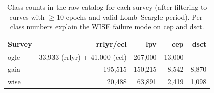 \begin{table}
\centering
\caption{Class counts in the raw catalog for each survey (after filtering to curves with $\ge 10$ epochs and valid Lomb--Scargle period).  Per-class numbers explain the WISE failure mode on cep and dsct.}
\label{tab:class_balance}
\begin{tabular}{lrrrr}
\toprule
Survey & rrlyr/ecl & lpv & cep & dsct \\
\midrule
ogle & 33,933 (rrlyr) + 41,000 (ecl) & 267,000 & 13,000 & -- \\
gaia & 195,515 & 150,215 & 8,542 & 8,870 \\
wise & 20,488 & 63,891 & 2,419 & 1,098 \\
\bottomrule
\end{tabular}
\end{table}
